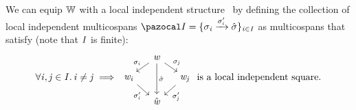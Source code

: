 \begin{lemma}\label{lem:local-ind-struct-W}
We can equip $\mathbb{W}$ with a local independent structure~\cite{simpson2018category} by defining the collection of local independent multicospans 
$ \mcatI = \{ \sigma_\vi \xto{\sigma_\vi'} \hat\sigma \}_{\vi \in \vI} $ as multicospans that satisfy (note that $\mathit{I}$ is finite): 
\[ \All{\vi, \vj \in \vI} \vi \neq \vj \implies 
    \begin{tikzcd}[sep=small] 
                    & {\vw} \arrow[ld, "\sigma_\vi"'] \arrow[dd, "{\hat\sigma}"] \arrow[rd, "\sigma_\vj"] & \\
        {\vw_\vi} \arrow[rd, "{\sigma_\vi'}"'] &            & {\vw_\vj} \arrow[ld, "{\sigma_\vj'}"] \\
                                          &  {\hat\vw} &
    \end{tikzcd}\text{ is a local independent square.} \]
\end{lemma}
